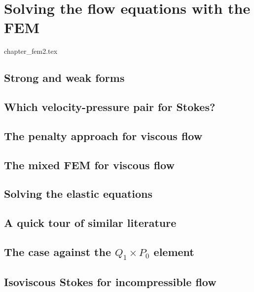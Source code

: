 \chapter{Solving the flow equations with the FEM} \label{solvingFEM} %

\begin{flushright} {\tiny {\color{gray} chapter\_fem2.tex}} \end{flushright}

\section{Strong and weak forms}  %
\section{Which velocity-pressure pair for Stokes?}\label{ss:pair} %

\newpage
\section{The penalty approach for viscous flow}\label{sec:penalty} %
\newpage
\section{The mixed FEM for viscous flow} \label{sec:mixed}  %
\newpage
\section{Solving the elastic equations}  %
\section{A quick tour of similar literature}  %
\section{The case against the $Q_1\times P_0$ element}  %
\section{Isoviscous Stokes for incompressible flow}\label{ss:isovisc}  %
